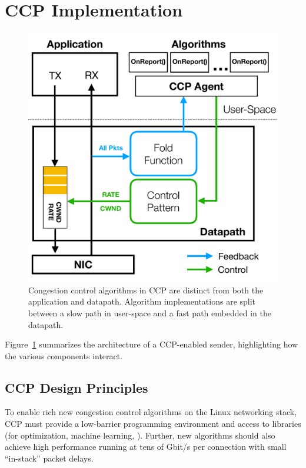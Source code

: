 \section{CCP Implementation}
\label{s:datapath}
%
\begin{figure}[t]
\centering
    \includegraphics[width=\columnwidth]{img/ccp_design_sigcomm}
    \caption{Congestion control algorithms in CCP are distinct from both the application and datapath. Algorithm implementations are split between a slow path in user-space and a fast path embedded in the datapath.}\label{fig:design}
\end{figure}
%
Figure~\ref{fig:design} summarizes the architecture of a CCP-enabled sender,
highlighting how the various components interact.

\subsection{CCP Design Principles}
\label{s:datapath:isolation}

To enable rich new congestion control algorithms on the Linux networking stack,
CCP must provide a low-barrier programming environment and access
to libraries (\eg for optimization, machine learning, \etc).
%
Further, new algorithms should also achieve high performance running at tens of
Gbit/s per connection with small ``in-stack'' packet delays.

